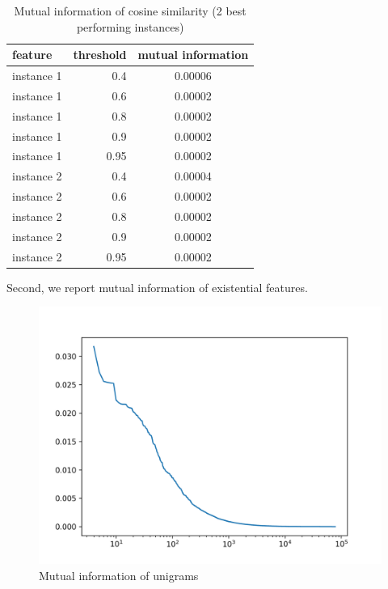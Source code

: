 \begin{table}[h!]
\centering
\begin{tabular}{lrS[table-format=3.2]}
\toprule
\textbf{feature} & \textbf{threshold} & \textbf{mutual information} \\
\midrule
instance 1 & 0.4 & 0.00006 \\
instance 1 & 0.6 & 0.00002 \\
instance 1 & 0.8 & 0.00002 \\
instance 1 & 0.9 & 0.00002 \\
instance 1 & 0.95 & 0.00002 \\
instance 2 & 0.4 & 0.00004 \\
instance 2 & 0.6 & 0.00002 \\
instance 2 & 0.8 & 0.00002 \\
instance 2 & 0.9 & 0.00002 \\
instance 2 & 0.95 & 0.00002 \\
\bottomrule
\end{tabular}
\caption{Mutual information of cosine similarity (2 best performing instances)}\label{tab:mi_cossim}
\end{table}


Second, we report mutual information of existential features.



\begin{figure}[ht]\centering
\includegraphics[width=130mm]{figures/unigrams.png}
\caption{Mutual information of unigrams}
\label{fig:mi_unigrams}
\end{figure}


